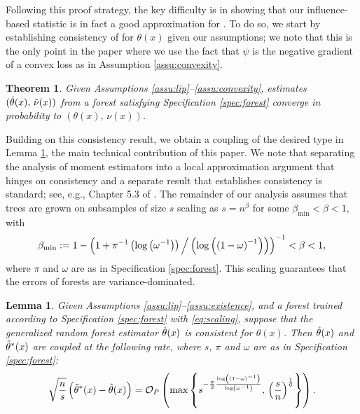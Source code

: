 \documentclass[aos]{imsart}
\theoremstyle{plain}
\newtheorem{lemm}[prop]{Lemma}
\newtheorem{theo}[prop]{Theorem}
\theoremstyle{definition}
\theoremstyle{remark}
\begin{document}
\begin{CJK}{UTF8}{gbsn}
{Following this proof strategy, the key difficulty is in showing that our influence-based statistic
 is in fact a good approximation for .
To do so, we start by establishing consistency of  for $\theta(x)$ given
our assumptions; we note that this is the only point in the paper where we use the fact that
$\psi$ is the negative gradient of a convex loss as in Assumption \ref{assu:convexity}.

\begin{theo}
\label{theo:consistency}
Given Assumptions \ref{assu:lip}--\ref{assu:convexity},
estimates $(\hat{\theta}(x), \, \hat{\nu}(x))$ from a 
forest satisfying Specification \ref{spec:forest}
converge in probability to $(\theta(x), \, \nu(x))$.
\end{theo}

Building on this consistency result, we obtain a coupling of the desired type in Lemma \ref{lemm:coupling},
the main technical contribution of this paper.
We note that separating the analysis of moment estimators
into a local approximation argument that hinges on consistency and a separate result that establishes
consistency is standard; see, e.g., Chapter 5.3 of \citet{van2000asymptotic}.
The remainder of our analysis assumes that trees are grown on subsamples of size $s$
scaling as $s = n^\beta$ for some $\beta_{\min} < \beta < 1$, with
\begin{equation}
\label{eq:scaling}
\beta_{\min} := 1 - \p{1 + \pi^{-1} \p{\log\p{\omega^{-1}}} \Big/\p{\log\p{\p{1 - \omega}^{-1}}}}^{-1} < \beta < 1,
\end{equation}
where $\pi$ and $\omega$ are as in Specification \ref{spec:forest}.
This scaling guarantees that the errors of forests are variance-dominated.

\begin{lemm}
\label{lemm:coupling}
Given Assumptions \ref{assu:lip}--\ref{assu:existence},
and a forest trained according to Specification \ref{spec:forest} with \eqref{eq:scaling},
suppose that the generalized random forest estimator $\hat{\theta}(x)$ is
consistent for $\theta(x)$. Then $\hat{\theta}(x)$ and $\tilde{\theta}^*(x)$ are coupled
at the following rate, where $s$, $\pi$ and $\omega$ are as in Specification \ref{spec:forest}:
\begin{equation}
\label{eq:coupling}
\sqrt{\frac{n}{s}} \p{\ttheta^*(x) - \htheta(x)} = \oo_P\p{\max\cb{s^{-\frac{\pi}{2}\frac{\log\p{\p{1 - \omega}^{-1}}}{\log\p{\omega^{-1}}}}, \, \p{\frac{s}{n}}^{\frac{1}{6}}}}.
\end{equation}
\end{lemm}

}
\end{CJK}
\end{document}
